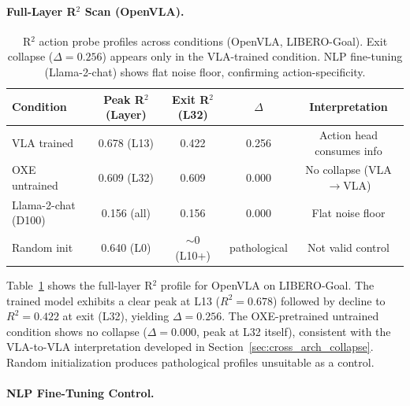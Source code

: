 \documentclass[letterpaper]{article}
\begin{document}
\paragraph{Full-Layer R$^2$ Scan (OpenVLA).}

\begin{table}[h]
\centering
\caption{R$^2$ action probe profiles across conditions (OpenVLA, LIBERO-Goal). Exit collapse ($\Delta = 0.256$) appears only in the VLA-trained condition. NLP fine-tuning (Llama-2-chat) shows flat noise floor, confirming action-specificity.}
\label{tab:r2_scan}
\begin{tabular}{lcccc}
\toprule
Condition & Peak R$^2$ (Layer) & Exit R$^2$ (L32) & $\Delta$ & Interpretation \\
\midrule
VLA trained & 0.678 (L13) & 0.422 & 0.256 & Action head consumes info \\
OXE untrained & 0.609 (L32) & 0.609 & 0.000 & No collapse (VLA$\to$VLA) \\
Llama-2-chat (D100) & 0.156 (all) & 0.156 & 0.000 & Flat noise floor \\
Random init & 0.640 (L0) & $\sim$0 (L10+) & pathological & Not valid control \\
\bottomrule
\end{tabular}
\end{table}

Table~\ref{tab:r2_scan} shows the full-layer R$^2$ profile for OpenVLA on LIBERO-Goal. The trained model exhibits a clear peak at L13 ($R^2 = 0.678$) followed by decline to $R^2 = 0.422$ at exit (L32), yielding $\Delta = 0.256$. The OXE-pretrained untrained condition shows no collapse ($\Delta = 0.000$, peak at L32 itself), consistent with the VLA-to-VLA interpretation developed in Section~\ref{sec:cross_arch_collapse}. Random initialization produces pathological profiles unsuitable as a control.

\paragraph{NLP Fine-Tuning Control.}
\end{document}
